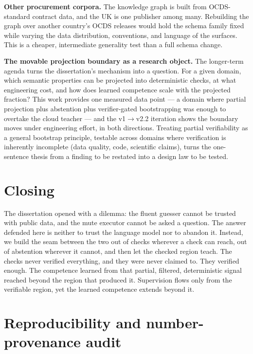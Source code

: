 \documentclass[10pt]{article} %
\begin{document}
\textbf{Other procurement corpora.} The knowledge graph is built from OCDS-standard contract data, and the UK is one publisher among many. Rebuilding the graph over another country's OCDS releases would hold the schema family fixed while varying the data distribution, conventions, and language of the surfaces. This is a cheaper, intermediate generality test than a full schema change.

\textbf{The movable projection boundary as a research object.} The longer-term agenda turns the dissertation's mechanism into a question. For a given domain, which semantic properties can be projected into deterministic checks, at what engineering cost, and how does learned competence scale with the projected fraction? This work provides one measured data point --- a domain where partial projection plus abstention plus verifier-gated bootstrapping was enough to overtake the cloud teacher --- and the v1$\rightarrow$v2.2 iteration shows the boundary moves under engineering effort, in both directions. Treating partial verifiability as a general bootstrap principle, testable across domains where verification is inherently incomplete (data quality, code, scientific claims), turns the one-sentence thesis from a finding to be restated into a design law to be tested.

\section{Closing}\label{sec:closing}

The dissertation opened with a dilemma: the fluent guesser cannot be trusted with public data, and the mute executor cannot be asked a question. The answer defended here is neither to trust the language model nor to abandon it. Instead, we build the seam between the two out of checks wherever a check can reach, out of abstention wherever it cannot, and then let the checked region teach. The checks never verified everything, and they were never claimed to. They verified enough. The competence learned from that partial, filtered, deterministic signal reached beyond the region that produced it. Supervision flows only from the verifiable region, yet the learned competence extends beyond it.




\appendix
\section{Reproducibility and number-provenance audit}\label{app:audit}
\end{document}
